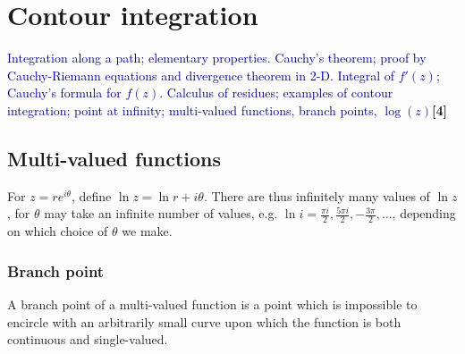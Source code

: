 \documentclass[a4paper]{article}
\begin{document}
\section{Contour integration}
{\small\textcolor{darkblue}{Integration along a path; elementary properties. Cauchy's theorem; proof by Cauchy-Riemann equations and divergence theorem in 2-D. Integral of $f'(z)$; Cauchy's formula for $f(z)$. Calculus of residues; examples of contour integration; point at infinity; multi-valued functions, branch points, $\log(z)$}\hfill\textbf{[4]}}
\subsection{Multi-valued functions}
For $z=re^{i\theta}$, define $\ln z=\ln r+i\theta$. There are thus infinitely many values of $\ln z$, for $\theta$ may take an infinite number of values, e.g. $\ln i=\frac{\pi i}{2}, \frac{5\pi i}{2}, -\frac{3\pi}{2},\dots$, depending on which choice of $\theta$ we make.
\subsubsection{Branch point}
\begin{defi}
A branch point of a multi-valued function is a point which is impossible to encircle with an arbitrarily small curve upon which the function is both continuous and single-valued. 
\end{defi}
\end{document}
